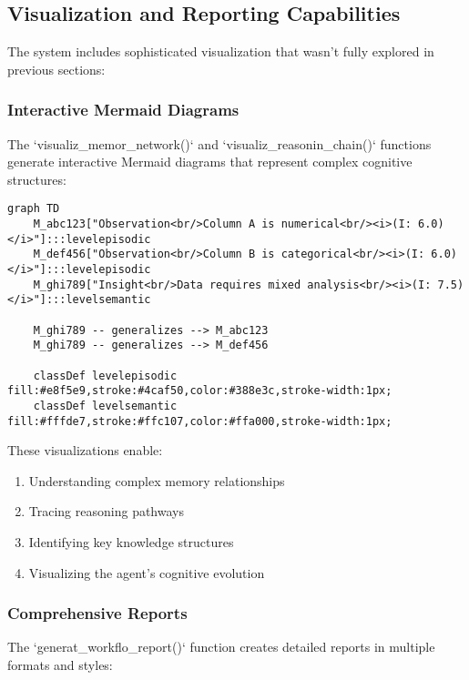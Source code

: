 \documentclass[12pt,a4paper]{article}
\begin{document}
\subsection*{Visualization and Reporting Capabilities}

The system includes sophisticated visualization that wasn't fully explored in previous sections:

\subsubsection*{Interactive Mermaid Diagrams}

The `visualiz\1\_memor\1\_network()` and `visualiz\1\_reasonin\1\_chain()` functions generate interactive Mermaid diagrams that represent complex cognitive structures:
\begin{pageablecode}
\begin{verbatim}
graph TD
    M_abc123["Observation<br/>Column A is numerical<br/><i>(I: 6.0)</i>"]:::levelepisodic
    M_def456["Observation<br/>Column B is categorical<br/><i>(I: 6.0)</i>"]:::levelepisodic
    M_ghi789["Insight<br/>Data requires mixed analysis<br/><i>(I: 7.5)</i>"]:::levelsemantic

    M_ghi789 -- generalizes --> M_abc123
    M_ghi789 -- generalizes --> M_def456

    classDef levelepisodic fill:#e8f5e9,stroke:#4caf50,color:#388e3c,stroke-width:1px;
    classDef levelsemantic fill:#fffde7,stroke:#ffc107,color:#ffa000,stroke-width:1px;
\end{verbatim}
\end{pageablecode}
These visualizations enable:
\begin{enumerate}[label=\arabic*.]
    \item Understanding complex memory relationships
    \item Tracing reasoning pathways
    \item Identifying key knowledge structures
    \item Visualizing the agent's cognitive evolution
\end{enumerate}

\subsubsection*{Comprehensive Reports}

The `generat\1\_workflo\1\_report()` function creates detailed reports in multiple formats and styles:
\end{document}
